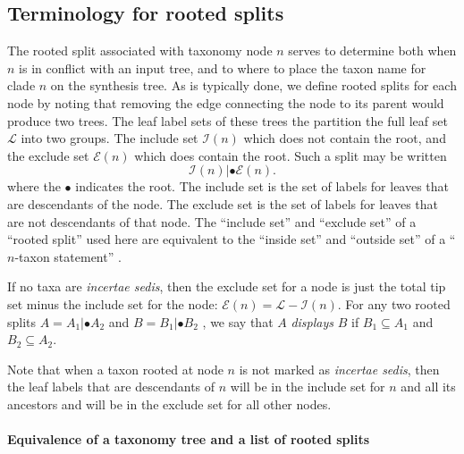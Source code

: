\documentclass[english]{article}
\begin{document}
\subsection{Terminology for rooted splits}

The rooted split associated with taxonomy node $n$ serves to determine both when $n$ is in conflict
with an input tree, and to where to place the taxon name for clade $n$ on the synthesis tree.
As is typically done, we define rooted splits for each node by noting that
removing the edge connecting the node to its parent would produce two trees.
The leaf label sets of these trees
the partition the full leaf set $\mathcal{L}$ into two groups.
The include set $\mathcal{I}(n)$ which
does not contain the root, and the exclude set $\mathcal{E}(n)$ which does contain the root.
Such a split may be written
\[ \mathcal{I}(n)|\bullet\mathcal{E}(n).\]
where the $\bullet$ indicates the root. 
The include set is the set of labels for leaves that are
descendants of the node.
The exclude set is the set of
labels for leaves that are not descendants of that node.
The ``include set'' and ``exclude set'' of a ``rooted split'' used here are equivalent
    to the ``inside set'' and ``outside set'' of a ``$n$-taxon statement''
    \citep[\emph{sensu}][]{Wilkinson1994}.

If no taxa are \emph{incertae sedis},
then the exclude set for a node is just the total tip set minus the include set
for the node: $\mathcal{E}(n)  =\mathcal{L}-\mathcal{I}(n)$.
For any two rooted splits $A=A_{1}|\bullet A_{2}$
and $B=B_{1}|\bullet B_{2}$ , we say that $A$ \emph{displays }$B$ if $B_{1}\subseteq A_{1}$ and $B_{2}\subseteq A_{2}$.

Note that when a taxon rooted at node $n$ is not marked as \emph{incertae sedis},
then the leaf labels that are descendants of $n$ will be in the include set for
$n$ and all its ancestors and will be in the exclude set for all other nodes.

\paragraph{Equivalence of a taxonomy tree and a list of rooted splits}
\end{document}
